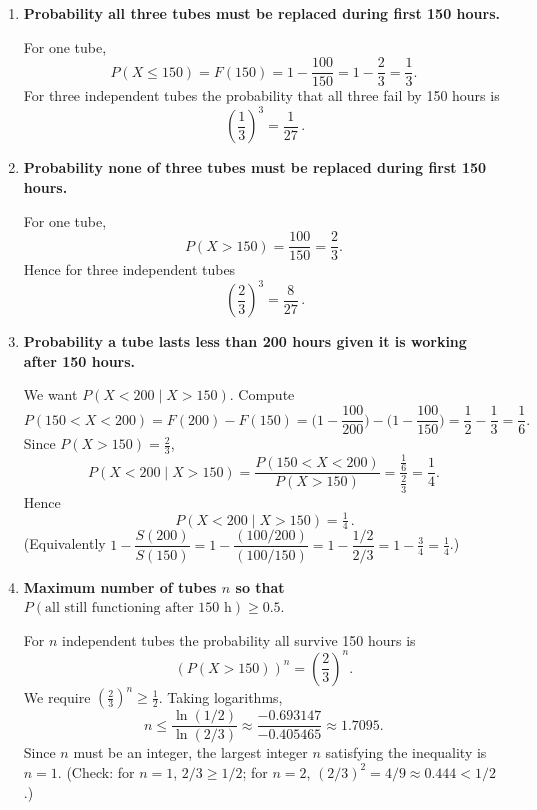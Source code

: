 \begin{enumerate}
\begin{enumerate}
    \item \textbf{Probability all three tubes must be replaced during first 150 hours.}
    
    For one tube,
    \[
    P(X\le 150)=F(150)=1-\frac{100}{150}=1-\frac{2}{3}=\frac{1}{3}.
    \]
    For three independent tubes the probability that all three fail by 150 hours is
    \[
    \boxed{\,\left(\frac{1}{3}\right)^{3}=\frac{1}{27}\, }.
    \]
    
    \item \textbf{Probability none of three tubes must be replaced during first 150 hours.}
    
    For one tube,
    \[
    P(X>150)=\frac{100}{150}=\frac{2}{3}.
    \]
    Hence for three independent tubes
    \[
    \boxed{\,\left(\frac{2}{3}\right)^{3}=\frac{8}{27}\, }.
    \]
    
    \item \textbf{Probability a tube lasts less than 200 hours given it is working after 150 hours.}
    
    We want \(P(X<200\mid X>150)\). Compute
    \[
    P(150<X<200)=F(200)-F(150)
    =\Big(1-\frac{100}{200}\Big)-\Big(1-\frac{100}{150}\Big)
    =\frac{1}{2}-\frac{1}{3}=\frac{1}{6}.
    \]
    Since \(P(X>150)=\tfrac{2}{3}\),
    \[
    P(X<200\mid X>150)=\frac{P(150<X<200)}{P(X>150)}
    =\frac{\tfrac{1}{6}}{\tfrac{2}{3}}=\frac{1}{4}.
    \]
    Hence
    \[
    \boxed{\,P(X<200\mid X>150)=\tfrac{1}{4}\, }.
    \]
    (Equivalently \(1-\dfrac{S(200)}{S(150)}=1-\dfrac{(100/200)}{(100/150)}=1-\dfrac{1/2}{2/3}=1-\tfrac{3}{4}=\tfrac{1}{4}\).)
    
    \item \textbf{Maximum number of tubes \(n\) so that } \(P(\text{all still functioning after 150 h})\ge 0.5.\)
    
    For \(n\) independent tubes the probability all survive 150 hours is
    \[
    \left(P(X>150)\right)^{n}=\left(\frac{2}{3}\right)^{n}.
    \]
    We require \(\left(\frac{2}{3}\right)^{n}\ge \tfrac{1}{2}\). Taking logarithms,
    \[
    n \le \frac{\ln(1/2)}{\ln(2/3)} \approx \frac{-0.693147}{-0.405465}\approx 1.7095.
    \]
    Since \(n\) must be an integer, the largest integer \(n\) satisfying the inequality is \(n=1\). (Check: for \(n=1\), \(2/3\ge 1/2\); for \(n=2\), \((2/3)^2=4/9\approx 0.444<1/2\).)
    

\end{enumerate}
\end{enumerate}
